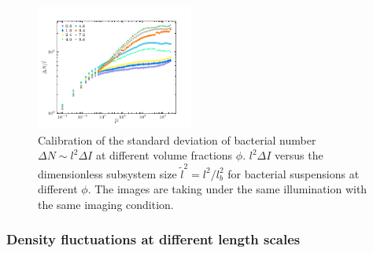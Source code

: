 \documentclass[twocolumn,aps,prx,amsmath,amssymb,longbibliography,superscriptaddress]{revtex4-2}
\begin{document}
\begin{figure}[t]
	\begin{center}
		\includegraphics[width=0.46\textwidth]{Figures/fig-8.pdf}
		\caption[Density autocorrelation]
		{Calibration of the standard deviation of bacterial number $\Delta N \sim l^2\Delta I$ at different volume fractions $\phi$. $l^2\Delta I$ versus the dimensionless subsystem size $\tilde{l}^2 = l^2/l_b^2$ for bacterial suspensions at different $\phi$. The images are taking under the same illumination with the same imaging condition.
		}
		\label{fig:same-conditions}
	\end{center}
\end{figure}

\subsubsection{Density fluctuations at different length scales}
\end{document}
